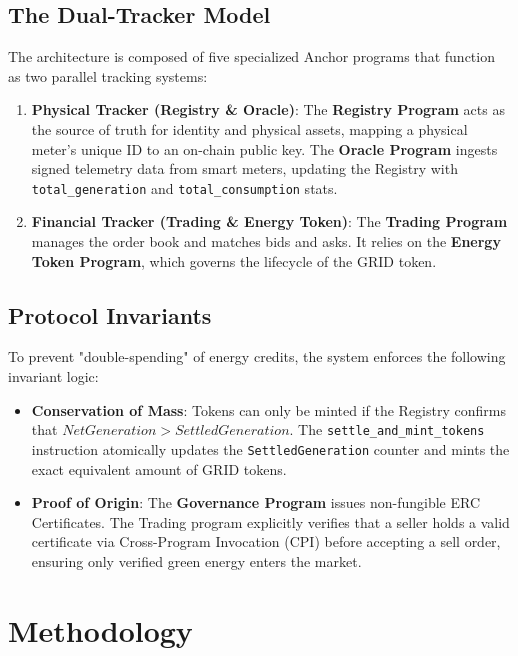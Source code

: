 \documentclass[conference]{IEEEtran}
\begin{document}
\subsection{The Dual-Tracker Model}
The architecture is composed of five specialized Anchor programs that function as two parallel tracking systems:

\begin{enumerate}
    \item \textbf{Physical Tracker (Registry \& Oracle)}:
    The \textbf{Registry Program} acts as the source of truth for identity and physical assets, mapping a physical meter's unique ID to an on-chain public key. The \textbf{Oracle Program} ingests signed telemetry data from smart meters, updating the Registry with \texttt{total\_generation} and \texttt{total\_consumption} stats.

    \item \textbf{Financial Tracker (Trading \& Energy Token)}:
    The \textbf{Trading Program} manages the order book and matches bids and asks. It relies on the \textbf{Energy Token Program}, which governs the lifecycle of the GRID token.
\end{enumerate}

\subsection{Protocol Invariants}
To prevent "double-spending" of energy credits, the system enforces the following invariant logic:

\begin{itemize}
    \item \textbf{Conservation of Mass}: Tokens can only be minted if the Registry confirms that $NetGeneration > SettledGeneration$. The \texttt{settle\_and\_mint\_tokens} instruction atomically updates the \texttt{SettledGeneration} counter and mints the exact equivalent amount of GRID tokens.
    
    \item \textbf{Proof of Origin}: The \textbf{Governance Program} issues non-fungible ERC Certificates. The Trading program explicitly verifies that a seller holds a valid certificate via Cross-Program Invocation (CPI) before accepting a sell order, ensuring only verified green energy enters the market.
\end{itemize}

\section{Methodology}
\end{document}
